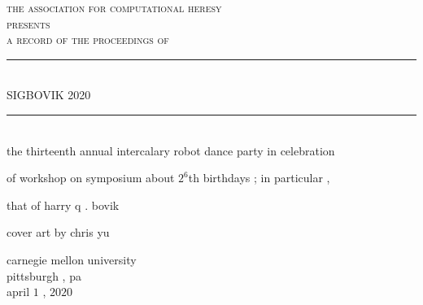\documentclass{article}
\begin{document}
\setmainfont{Splotch.ttf}
\setsansfont{Birbaslo.ttf}

\newcommand{\HRule}{\rule{\linewidth}{0.5mm}}

\begin{titlepage}
\begin{center}

\textsc{\LARGE the association for computational heresy}\\[0.5cm]

\textsc{\large presents}\\[1cm]

\textsc{\Large a record of the proceedings of}\\[0.5cm]
\HRule \\[0.4cm]
{ \Huge \sf SIGBOVIK 2020 \\[0.4cm] }

\HRule \\[2cm]


the thirteenth annual intercalary robot dance party in celebration

of workshop on symposium about $2^6$th birthdays{ ;} in particular{ ,}

that of harry q{ .} bovik

\vfill

cover art by chris yu

\vfill

{\Large carnegie mellon university\\[0.25cm]
pittsburgh{ ,} pa\\[0.3cm]
april $1${ ,} $2020$}

\end{center}
\end{titlepage}
\end{document}
